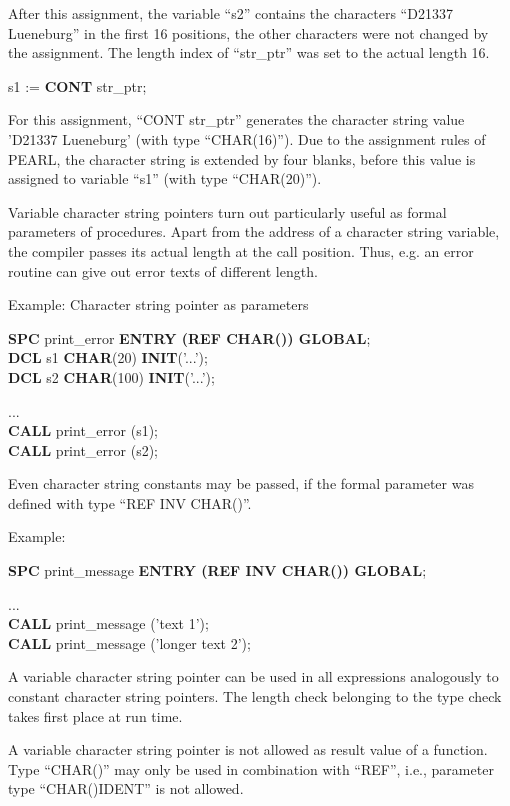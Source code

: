 \begin{tobedone}
After this assignment, the variable ``s2'' contains the characters
``D21337 Lueneburg'' in the first 16 positions, the other characters
were not changed by the assignment. The length index of ``str\_ptr'' was
set to the actual length 16.

s1 := {\bf CONT} str\_ptr;

For this assignment, ``CONT str\_ptr'' generates the character string
value 'D21337 Lueneburg' (with type ``CHAR(16)''). Due to the assignment
rules of PEARL, the character string is extended by four blanks, before
this value is assigned to variable ``s1'' (with type ``CHAR(20)'').

Variable character string pointers turn out particularly useful as
formal parameters of procedures. Apart from the address of a character
string variable, the compiler passes its actual length at the call
position.  Thus, e.g. an error routine can give out error texts of
different length.

Example: Character string pointer as parameters

{\bf SPC} print\_error {\bf ENTRY (REF CHAR()) GLOBAL};\\
{\bf DCL} s1 {\bf CHAR}(20)  {\bf INIT}('...');\\
{\bf DCL} s2 {\bf CHAR}(100) {\bf INIT}('...');

...\\
{\bf CALL} print\_error (s1);\\
{\bf CALL} print\_error (s2);

Even character string constants may be passed, if the formal parameter
was defined with type ``REF INV CHAR()''.

Example:

{\bf SPC} print\_message {\bf ENTRY (REF INV CHAR()) GLOBAL};

...\\
{\bf CALL} print\_message ('text 1');\\
{\bf CALL} print\_message ('longer text 2');

A variable character string pointer can be used in all expressions
analogously to constant character string pointers. The length check
belonging to the type check takes first place at run time.

A variable character string pointer is not allowed as result value of a
function. Type ``CHAR()'' may only be used in combination with ``REF'',
i.e., parameter type ``CHAR()IDENT'' is not allowed.
\end{tobedone}

